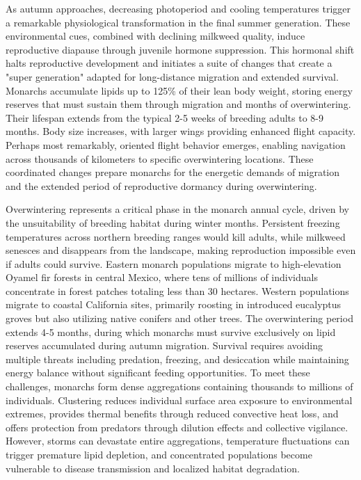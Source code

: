 As autumn approaches, decreasing photoperiod and cooling temperatures trigger a remarkable physiological transformation in the final summer generation. These environmental cues, combined with declining milkweed quality, induce reproductive diapause through juvenile hormone suppression. This hormonal shift halts reproductive development and initiates a suite of changes that create a "super generation" adapted for long-distance migration and extended survival. Monarchs accumulate lipids up to 125\% of their lean body weight, storing energy reserves that must sustain them through migration and months of overwintering. Their lifespan extends from the typical 2-5 weeks of breeding adults to 8-9 months. Body size increases, with larger wings providing enhanced flight capacity. Perhaps most remarkably, oriented flight behavior emerges, enabling navigation across thousands of kilometers to specific overwintering locations. These coordinated changes prepare monarchs for the energetic demands of migration and the extended period of reproductive dormancy during overwintering.

Overwintering represents a critical phase in the monarch annual cycle, driven by the unsuitability of breeding habitat during winter months. Persistent freezing temperatures across northern breeding ranges would kill adults, while milkweed senesces and disappears from the landscape, making reproduction impossible even if adults could survive. Eastern monarch populations migrate to high-elevation Oyamel fir forests in central Mexico, where tens of millions of individuals concentrate in forest patches totaling less than 30 hectares. Western populations migrate to coastal California sites, primarily roosting in introduced eucalyptus groves but also utilizing native conifers and other trees. The overwintering period extends 4-5 months, during which monarchs must survive exclusively on lipid reserves accumulated during autumn migration. Survival requires avoiding multiple threats including predation, freezing, and desiccation while maintaining energy balance without significant feeding opportunities. To meet these challenges, monarchs form dense aggregations containing thousands to millions of individuals. Clustering reduces individual surface area exposure to environmental extremes, provides thermal benefits through reduced convective heat loss, and offers protection from predators through dilution effects and collective vigilance. However, storms can devastate entire aggregations, temperature fluctuations can trigger premature lipid depletion, and concentrated populations become vulnerable to disease transmission and localized habitat degradation.

